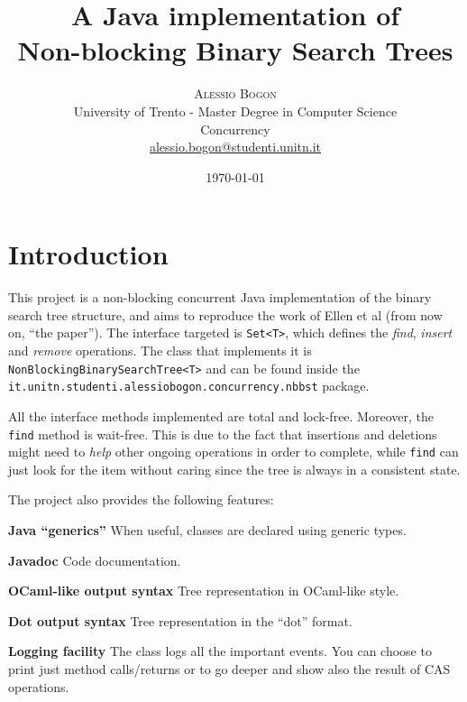 \documentclass[a4paper,12pt]{article}
\title{\textbf{A Java implementation of \\Non-blocking Binary Search Trees}} %
\author{
    \textsc{Alessio Bogon}\\[2mm] %
    \normalsize University of Trento - Master Degree in Computer Science\\ %
    \normalsize Concurrency\\
    \href{mailto:alessio.bogon@studenti.unitn.it}{alessio.bogon@studenti.unitn.it} %
}
\date{\today}
\begin{document}
\maketitle

\section{Introduction} %
\label{sec:introduction}
This project is a non-blocking concurrent Java implementation of the binary search tree structure, and aims to reproduce the work of Ellen et al\cite{ellen10} (from now on, ``the paper'').
The interface targeted is \texttt{Set<T>}, which defines the \emph{find}, \emph{insert} and \emph{remove} operations.
The class that implements it is \texttt{Non\-Blocking\-Binary\-Search\-Tree\-<T>} and can be found inside the \texttt{it.uni\-tn.stu\-den\-ti.a\-les\-sio\-bo\-gon.con\-cur\-ren\-cy.nbbst} package.

All the interface methods implemented are total and lock-free. Moreover, the \texttt{find} method is wait-free.
This is due to the fact that insertions and deletions might need to \emph{help} other ongoing operations in order to complete, while \texttt{find} can just look for the item without caring since the tree is always in a consistent state.

The project also provides the following features:
\begin{itemize*}
    \item \textbf{Java ``generics''} When useful, classes are declared using generic types.
    \item \textbf{Javadoc} Code documentation.
    \item \textbf{OCaml-like output syntax} Tree representation in OCaml-like style.
    \item \textbf{Dot output syntax} Tree representation in the ``dot'' format.
    \item \textbf{Logging facility} The class logs all the important events. You can choose to print just method calls/returns or to go deeper and show also the result of CAS operations.
\end{itemize*}

\end{document}
